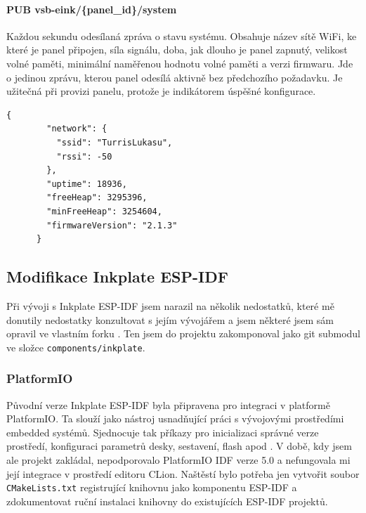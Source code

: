 \paragraph*{PUB vsb-eink/\{panel\_id\}/system}
Každou sekundu odesílaná zpráva o stavu systému. Obsahuje název sítě WiFi, ke které je panel připojen, síla signálu, doba, jak dlouho je panel zapnutý, velikost volné paměti, minimální naměřenou hodnotu volné paměti a verzi firmwaru. Jde o jedinou zprávu, kterou panel odesílá aktivně bez předchozího požadavku. Je užitečná při provizi panelu, protože je indikátorem úspěšné konfigurace.

\begin{lstlisting}[label=src:example-system-status,caption={Ukázka zprávy stavu systému}]
    {
        "network": {
          "ssid": "TurrisLukasu",
          "rssi": -50
        },
        "uptime": 18936,
        "freeHeap": 3295396,
        "minFreeHeap": 3254604,
        "firmwareVersion": "2.1.3"
      }
\end{lstlisting}

\subsection{Modifikace Inkplate ESP-IDF}
Při vývoji s Inkplate ESP-IDF jsem narazil na několik nedostatků, které mě donutily nedostatky konzultovat s jejím vývojářem a jsem některé jsem sám opravil ve vlastním forku \cite{TajnymagESPIDFInkPlateESPIDFInkPlate}. Ten jsem do projektu zakomponoval jako git submodul ve složce \verb|components/inkplate|.

\subsubsection{PlatformIO} Původní verze Inkplate ESP-IDF byla připravena pro integraci v platformě PlatformIO. Ta slouží jako nástroj usnadňující práci s vývojovými prostředími embedded systémů. Sjednocuje tak příkazy pro inicializaci správné verze prostředí, konfiguraci parametrů desky, sestavení, flash apod \cite{WhatPlatformIOPlatformIO}. V době, kdy jsem ale projekt zakládal, nepodporovalo PlatformIO IDF verze 5.0 a nefungovala mi její integrace v prostředí editoru CLion. Naštěstí bylo potřeba jen vytvořit soubor \lstinline|CMakeLists.txt| registrující knihovnu jako komponentu ESP-IDF a zdokumentovat ruční instalaci knihovny do existujících ESP-IDF projektů.

